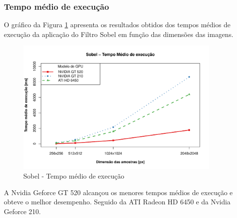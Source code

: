 \subsubsection{Tempo médio de execução}
O gráfico da Figura \ref{fig:sobel_tempo} apresenta os resultados obtidos dos tempos médios de execução da aplicação do Filtro Sobel em função das dimensões das imagens.
\FloatBarrier
\begin{figure}[!ht]
\centering
\includegraphics[width=0.9\textwidth]{sobel_tempo_medio_exec.pdf}
\caption{Sobel - Tempo médio de execução}
\label{fig:sobel_tempo}
\end{figure}
\FloatBarrier
A Nvidia Geforce GT 520 alcançou os menores tempos médios de execução e obteve o melhor desempenho. Seguido da ATI Radeon HD 6450 e da Nvidia Geforce 210.
\FloatBarrier
